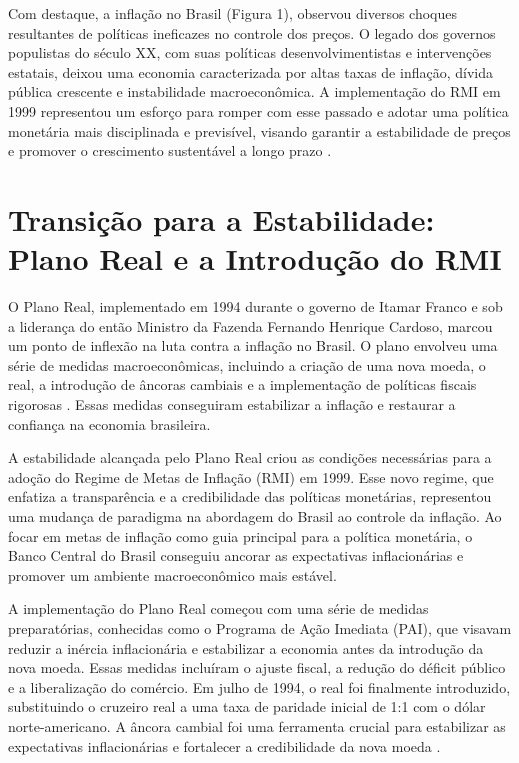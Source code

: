\documentclass[12pt,oneside,a4paper,chapter=TITLE,english,brazil,sumario=abnt-6027-2012]{abntex2}
\begin{document}
Com destaque, a inflação no Brasil (Figura 1), observou diversos choques resultantes de políticas ineficazes no controle dos preços. O legado dos governos populistas do século XX, com suas políticas desenvolvimentistas e intervenções estatais, deixou uma economia caracterizada por altas taxas de inflação, dívida pública crescente e instabilidade macroeconômica. A implementação do RMI em 1999 representou um esforço para romper com esse passado e adotar uma política monetária mais disciplinada e previsível, visando garantir a estabilidade de preços e promover o crescimento sustentável a longo prazo \cite{amaurypatrickgremaud_2009_economia}.

\section{Transição para a Estabilidade: Plano Real e a Introdução do RMI}

O Plano Real, implementado em 1994 durante o governo de Itamar Franco e sob a liderança do então Ministro da Fazenda Fernando Henrique Cardoso, marcou um ponto de inflexão na luta contra a inflação no Brasil. O plano envolveu uma série de medidas macroeconômicas, incluindo a criação de uma nova moeda, o real, a introdução de âncoras cambiais e a implementação de políticas fiscais rigorosas \cite{amaurypatrickgremaud_2009_economia}. Essas medidas conseguiram estabilizar a inflação e restaurar a confiança na economia brasileira.

A estabilidade alcançada pelo Plano Real criou as condições necessárias para a adoção do Regime de Metas de Inflação (RMI) em 1999. Esse novo regime, que enfatiza a transparência e a credibilidade das políticas monetárias, representou uma mudança de paradigma na abordagem do Brasil ao controle da inflação. Ao focar em metas de inflação como guia principal para a política monetária, o Banco Central do Brasil conseguiu ancorar as expectativas inflacionárias e promover um ambiente macroeconômico mais estável.

A implementação do Plano Real começou com uma série de medidas preparatórias, conhecidas como o Programa de Ação Imediata (PAI), que visavam reduzir a inércia inflacionária e estabilizar a economia antes da introdução da nova moeda. Essas medidas incluíram o ajuste fiscal, a redução do déficit público e a liberalização do comércio. Em julho de 1994, o real foi finalmente introduzido, substituindo o cruzeiro real a uma taxa de paridade inicial de 1:1 com o dólar norte-americano. A âncora cambial foi uma ferramenta crucial para estabilizar as expectativas inflacionárias e fortalecer a credibilidade da nova moeda \cite{silva_2002_plano}. 
\end{document}
